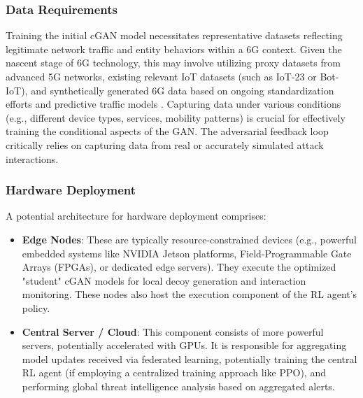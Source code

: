 \documentclass{article}
\begin{document}
\subsubsection{Data Requirements}
Training the initial cGAN model necessitates representative datasets reflecting legitimate network traffic and entity behaviors within a 6G context. Given the nascent stage of 6G technology, this may involve utilizing proxy datasets from advanced 5G networks, existing relevant IoT datasets (such as IoT-23 or Bot-IoT), and synthetically generated 6G data based on ongoing standardization efforts and predictive traffic models \cite{Wen2024GenerativeAFU}. Capturing data under various conditions (e.g., different device types, services, mobility patterns) is crucial for effectively training the conditional aspects of the GAN. The adversarial feedback loop critically relies on capturing data from real or accurately simulated attack interactions.

\subsubsection{Hardware Deployment}
A potential architecture for hardware deployment comprises:
\begin{itemize}[label=\textbf{\textbullet}]
    \item \textbf{Edge Nodes}: These are typically resource-constrained devices (e.g., powerful embedded systems like NVIDIA Jetson platforms, Field-Programmable Gate Arrays (FPGAs), or dedicated edge servers). They execute the optimized "student" cGAN models for local decoy generation and interaction monitoring. These nodes also host the execution component of the RL agent's policy.
    \item \textbf{Central Server / Cloud}: This component consists of more powerful servers, potentially accelerated with GPUs. It is responsible for aggregating model updates received via federated learning, potentially training the central RL agent (if employing a centralized training approach like PPO), and performing global threat intelligence analysis based on aggregated alerts.
\end{itemize}
\end{document}
